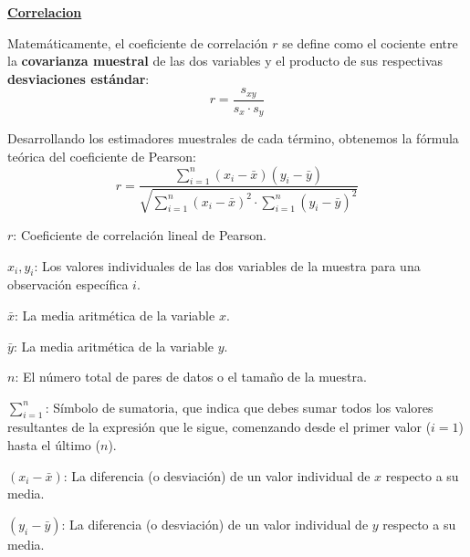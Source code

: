 \documentclass[10pt,a4paper]{article}
\begin{document}
{\large\bfseries\uline{Correlacion}}
\vspace{2pt}

Matemáticamente, el coeficiente de correlación $r$ se define como el cociente entre la \textbf{covarianza muestral} de las dos variables y el producto de sus respectivas \textbf{desviaciones estándar}:
\[
r = \frac{s_{xy}}{s_x \cdot s_y} \tag{2}
\]

Desarrollando los estimadores muestrales de cada término, obtenemos la fórmula teórica del coeficiente de Pearson:
\[
r = \frac{\sum_{i=1}^{n} (x_i - \bar{x})(y_i - \bar{y})}{\sqrt{\sum_{i=1}^{n}(x_i-\bar{x})^2 \cdot \sum_{i=1}^{n}(y_i-\bar{y})^2}} \tag{3}
\]

\begin{minipage}[t]{0.56\textwidth}
\vspace{0pt}
{\footnotesize
$r$: Coeficiente de correlación lineal de Pearson.

$x_i, y_i$: Los valores individuales de las dos variables de la muestra para una observación específica $i$.

$\bar{x}$: La media aritmética de la variable $x$.

$\bar{y}$: La media aritmética de la variable $y$.

$n$: El número total de pares de datos o el tamaño de la muestra.

$\sum_{i=1}^{n}$: Símbolo de sumatoria, que indica que debes sumar todos los valores resultantes de la expresión que le sigue, comenzando desde el primer valor ($i=1$) hasta el último ($n$).

$(x_i - \bar{x})$: La diferencia (o desviación) de un valor individual de $x$ respecto a su media.

$(y_i - \bar{y})$: La diferencia (o desviación) de un valor individual de $y$ respecto a su media.
}
\end{minipage}\hfill
\end{document}
